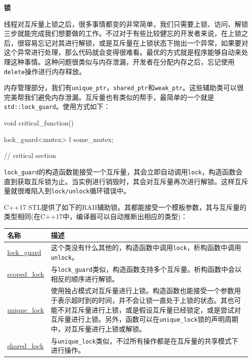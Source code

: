 \textbf{锁}

线程对互斥量上锁之后，很多事情都变的非常简单，我们只需要上锁、访问、解锁三步就能完成我们想要做的工作。不过对于有些比较健忘的开发者来说，在上锁之后，很容易忘记对其进行解锁，或是互斥量在上锁状态下抛出一个异常，如果要对这个异常进行处理，那么代码就会变得很难看。最优的方式就是程序能够自动来处理这种事情。这种问题很类似与内存泄漏，开发者在分配内存之后，忘记使用\texttt{delete}操作进行内存释放。

内存管理部分，我们有\texttt{unique\_ptr}，\texttt{shared\_ptr}和\texttt{weak\_ptr}。这些辅助类可以很完美帮我们避免内存泄漏。互斥量也有类似的帮手，最简单的一个就是\texttt{std::lock\_guard}。使用方式如下：

\begin{codebox}[cpp]
void critical_function()
{
    lock_guard<mutex> l {some_mutex};
    
    // critical section
}
\end{codebox}

\texttt{lock\_guard}的构造函数能接受一个互斥量，其会立即自动调用\texttt{lock}，构造函数会直到获取互斥锁为止。当实例进行销毁时，其会对互斥量再次进行解锁。这样互斥量就很难陷入到\texttt{lock/unlock}循环错误中。

C++17 STL提供了如下的RAII辅助锁。其都能接受一个模板参数，其与互斥量的类型相同(在C++17中，编译器可以自动推断出相应的类型)：

\begin{table}[htbp]\centering
\begin{tabularx}{\textwidth}{lX}
\toprule
名称 & 描述 \\
\midrule
\href{http://zh.cppreference.com/w/cpp/thread/lock_guard}{lock\_guard} & 这个类没有什么其他的，构造函数中调用\texttt{lock}，析构函数中调用\texttt{unlock}。 \\
\href{http://zh.cppreference.com/w/cpp/thread/scoped_lock}{scoped\_lock} & 与\texttt{lock\_guard}类似，构造函数支持多个互斥量。析构函数中会以相反的顺序进行解锁。 \\
\href{http://zh.cppreference.com/w/cpp/thread/unique_lock}{unique\_lock} & 使用独占模式对互斥量进行上锁。构造函数也能接受一个参数用于表示超时到的时间，并不会让锁一直处于上锁的状态。其也可能不对互斥量进行上锁，或是假设互斥量已经锁定，或是尝试对互斥量进行上锁。另外，函数可以在\texttt{unique\_lock}锁的声明周期中，对互斥量进行上锁或解锁。 \\
\href{http://zh.cppreference.com/w/cpp/thread/shared_lock}{shared\_lock} & 与\texttt{unique\_lock}类似，不过所有操作都是在互斥量的共享模式下进行操作。 \\
\bottomrule
\end{tabularx}
\end{table}

